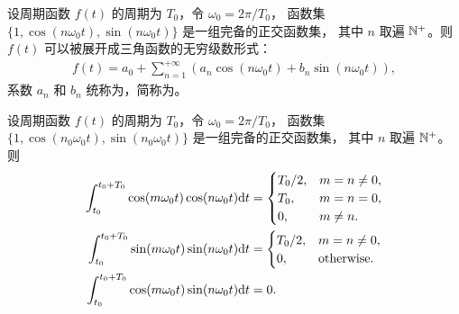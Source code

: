 \begin{definition}[三角形式傅里叶级数]
    设周期函数 $f(t)$ 的周期为 $T_0$，令 $\omega_0 = 2\pi/T_0$，
    函数集 $\{1, \cos(n\omega_0 t), \sin(n\omega_0 t)\}$ 是一组完备的正交函数集，
    其中 $n$ 取遍 $\mathbb{N}^{+}$。则 $f(t)$ 可以被展开成三角函数的无穷级数形式：
    \begin{align*}
        f(t) = a_0 + \sum_{n = 1}^{+\infty}(a_n\cos(n\omega_0 t) + b_n\sin(n\omega_0 t)),
    \end{align*}
    系数 $a_n$ 和 $b_n$ 统称为，简称为。
\end{definition}

\begin{lemma}
    设周期函数 $f(t)$ 的周期为 $T_0$，令 $\omega_0 = 2\pi/T_0$，
    函数集 $\{1, \cos(n_0\omega_0 t), \sin(n_0\omega_0 t)\}$ 是一组完备的正交函数集，
    其中 $n$ 取遍 $\mathbb{N}^{+}$。则
    \begin{align*}
        \int_{t_0}^{t_0 + T_0}\cos(m\omega_0 t)\cos (n\omega_0 t)\mathrm{d}t & = \begin{cases}
            T_0 / 2, & m = n \neq 0, \\
            T_0, & m = n = 0, \\
            0, & m \neq n.
        \end{cases} \\
        \int_{t_0}^{t_0 + T_0}\sin(m\omega_0 t)\sin (n\omega_0 t)\mathrm{d}t & = \begin{cases}
            T_0 / 2, & m = n \neq 0, \\
            0, & \text{otherwise}.
        \end{cases} \\
        \int_{t_0}^{t_0 + T_0}\cos(m\omega_0 t)\sin (n\omega_0 t)\mathrm{d}t & = 0.
    \end{align*}
\end{lemma}

